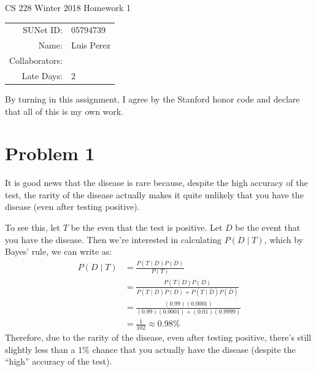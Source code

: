 \documentclass[12pt]{article}
\begin{document}
\begin{center}
{\Large CS 228 Winter 2018 Homework 1}

\begin{tabular}{rl}
SUNet ID: & 05794739 \\
Name: & Luis Perez \\
Collaborators: & \\
Late Days: & 2
\end{tabular}
\end{center}

By turning in this assignment, I agree by the Stanford honor code and declare
that all of this is my own work.

\section*{Problem 1}
It is good news that the disease is rare because, despite the high accuracy of the test, the rarity of the disease actually makes it quite unlikely that you have the disease (even after testing positive).

To see this, let $T$ be the even that the test is positive. Let $D$ be the event that you have the disease. Then we're interested in calculating $P(D \mid T)$, which by Bayes' rule, we can write as:
\begin{align*}
	P(D \mid T) &= \frac{P(T \mid D)P(D)}{P(T)} \\
	&= \frac{P(T \mid D)P(D)}{P(T \mid D)P(D) + P(T \mid \bar{D})P(\bar{D})} \\
	&= \frac{(0.99)(0.0001)}{(0.99)(0.0001) + (0.01)(0.9999)} \\
	&= \frac{1}{102} \approx 0.98\%
\end{align*}
Therefore, due to the rarity of the disease, even after testing positive, there's still slightly less than a $1\%$ chance that you actually have the disease (despite the ``high'' accuracy of the test).

\pagebreak
\end{document}
